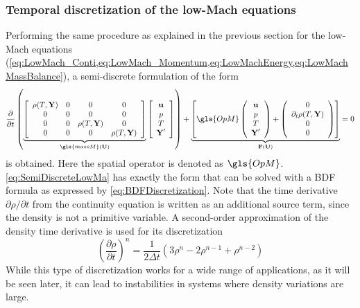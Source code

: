 \subsubsection{Temporal discretization of the low-Mach equations}
Performing the same procedure as explained in the previous section for the low-Mach equations (\cref{eq:LowMach_Conti,eq:LowMach_Momentum,eq:LowMachEnergy,eq:LowMachMassBalance}), a semi-discrete formulation of the form
\begin{equation}
	\frac{\partial}{\partial t} \left(
	\underbrace{	\left[ 
		\begin{array}{cccc}
			\rho(T,\vec{Y})&0&0&0\\
			0&0&0&0\\
			0&0&	\rho(T,\vec{Y})&0\\
			0&0&0&	\rho(T,\vec{Y})
		\end{array}
		\right]}_{\gls{massM}(\vectr{U})}
	\left[
	\begin{array}{cccc}
		\vec{u}\\
		p\\
		T\\
		\vec{Y}'
	\end{array}
	\right]
	\right)
	+
	\underbrace{	\left[ \gls{OpM}	\left(
		\begin{array}{cccc}
			\vec{u}\\
			p\\
			T\\
			\vec{Y}'
		\end{array}
		\right)
		+
		\left(
		\begin{array}{cccc}
			0\\
			\partial_t 	\rho(T,\vec{Y})\\
			0\\
			0
		\end{array}
		\right)
		\right]}_{\vec{F}(\vectr{U})} = 0 \label{eq:SemiDiscreteLowMa}
\end{equation} 
is obtained. Here the spatial operator is denoted as $\gls{OpM}$.  \cref{eq:SemiDiscreteLowMa} has exactly the form that can be solved with a BDF formula as expressed by \cref{eq:BDFDiscretization}. Note that the time derivative $\partial \rho /\partial t$ from the continuity equation is written as an additional source term, since the density is not a primitive variable. A second-order approximation of the density time derivative is used for its discretization
\begin{equation}
	\left(\frac{\partial \rho}{\partial t} \right)^n= \frac{1}{2\Delta t}\left(3\rho^n-2\rho^{n-1}+\rho^{n-2}\right) \label{eq:DiscretizationDrhoDT}
\end{equation}
While this type of discretization works for a wide range of applications, as it will be seen later, it can lead to instabilities in systems where density variations are large. 
